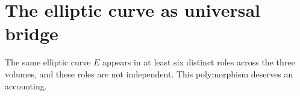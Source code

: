 \documentclass[11pt]{article}
\begin{document}
%
%
%
%


\section{The elliptic curve as universal bridge}
\label{sec:motivic-elliptic-bridge}

The same elliptic curve $E$ appears in at least six distinct roles across the three volumes, and these roles are not independent. This polymorphism deserves an accounting.
\end{document}

